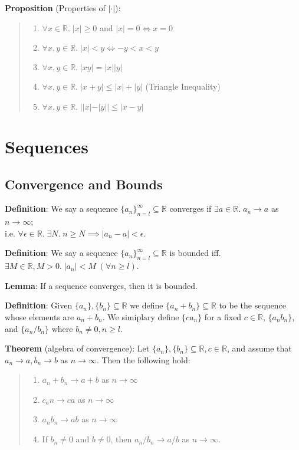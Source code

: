 \documentclass[11pt]{article}
\begin{document}
\textbf{Proposition} (Properties of $|\cdot|$):
\begin{quote}
	\begin{enumerate}
	\item $\forall x \in \mathbb{R}.\; |x| \geq 0$ and $|x| = 0 \iff x = 0$
	\item $\forall x,y \in \mathbb{R}.\; |x| < y \iff -y < x < y$
	\item $\forall x,y \in \mathbb{R}.\; |xy| = |x||y|$
	\item $\forall x,y \in \mathbb{R}.\; |x+y| \leq |x| + |y|$ (Triangle Inequality)
	\item $\forall x,y \in \mathbb{R}.\; ||x|-|y|| \leq |x-y|$
	\end{enumerate}
\end{quote}

\section{Sequences}

\subsection{Convergence and Bounds}

\textbf{Definition}: We say a sequence $\{a_n\}_{n=l}^{\infty} \subseteq \mathbb{R}$ converges if $\exists a \in \mathbb{R}.\; a_n \to a$ as $n \to \infty$;\\
i.e. $\forall \epsilon \in \mathbb{R}.\; \exists N.\; n \geq N \implies |a_n - a| < \epsilon$.

\textbf{Definition}: We say a sequence $\{a_n\}_{n=l}^{\infty} \subseteq \mathbb{R}$ is bounded iff. $\exists M \in \mathbb{R}, M > 0.\; |a_n| < M \;(\forall n \geq l)$.

\textbf{Lemma}: If a sequence converges, then it is bounded.

\textbf{Definition}: Given $\{a_n\}, \{b_n\} \subseteq \mathbb{R}$ we define $\{a_n + b_n\} \subseteq \mathbb{R}$ to be the sequence whose elements are $a_n + b_n$. We simiplary define $\{ca_n\}$ for a fixed $c \in \mathbb{R}$, $\{a_nb_n\}$, and $\{a_n/b_n\}$ where $b_n \neq 0, n \geq l$.

\textbf{Theorem} (algebra of convergence): Let $\{a_n\}, \{b_n\} \subseteq \mathbb{R}, c \in \mathbb{R}$, and assume that $a_n \to a, b_n \to b$ as $n \to \infty$. Then the following hold:
\begin{quote}\vspace{-0.3cm}
	\begin{enumerate}
	\item $a_n + b_n \to a + b$ as $n \to \infty$
	\item $c_an \to ca$ as $n \to \infty$
	\item $a_nb_n \to ab$ as $n \to \infty$
	\item If $b_n \neq 0$ and $b \neq 0$, then $a_n/b_n \to a/b$ as $n \to \infty$.
	\end{enumerate}
\end{quote}
\end{document}
